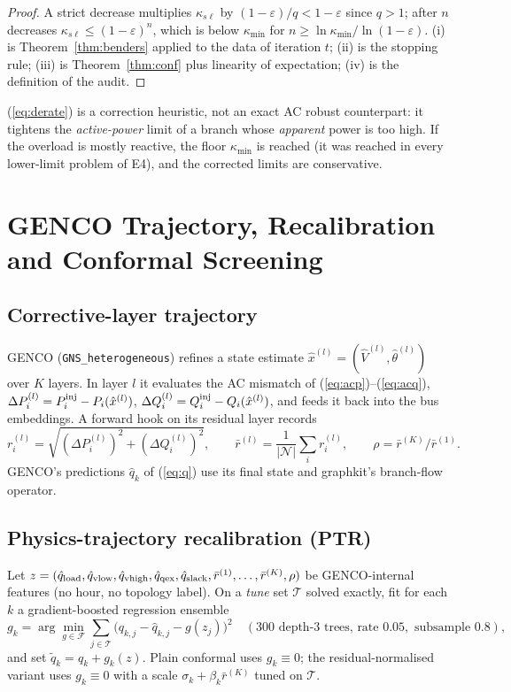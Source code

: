 \begin{proof}
A strict decrease multiplies $\kappa_{s\ell}$ by $(1-\varepsilon)/q<1-\varepsilon$ since $q>1$; after
$n$ decreases $\kappa_{s\ell}\le(1-\varepsilon)^n$, which is below $\kappa_{\min}$ for
$n\ge\ln\kappa_{\min}/\ln(1-\varepsilon)$. (i) is Theorem~\ref{thm:benders} applied to the data
of iteration $t$; (ii) is the stopping rule; (iii) is Theorem~\ref{thm:conf} plus linearity
of expectation; (iv) is the definition of the audit.
\end{proof}
\begin{remark}
(\ref{eq:derate}) is a correction heuristic, not an exact AC robust counterpart: it
tightens the \emph{active-power} limit of a branch whose \emph{apparent} power is too high.
If the overload is mostly reactive, the floor $\kappa_{\min}$ is reached (it was reached in
every lower-limit problem of E4), and the corrected limits are conservative.
\end{remark}

\section{GENCO Trajectory, Recalibration and Conformal Screening}
\label{app:conf}

\subsection{Corrective-layer trajectory}
GENCO (\texttt{GNS\_heterogeneous}) refines a state estimate $\hat x^{(l)}=(\hat V^{(l)},\hat\theta^{(l)})$ over
$K$ layers. In layer $l$ it evaluates the AC mismatch of (\ref{eq:acp})--(\ref{eq:acq}),
$\Delta P^{(l)}_i=P^{\rm inj}_i-P_i(\hat x^{(l)})$, $\Delta Q^{(l)}_i=Q^{\rm inj}_i-Q_i(\hat x^{(l)})$, and feeds it back
into the bus embeddings. A forward hook on its residual layer records
\begin{equation}
r^{(l)}_i=\sqrt{(\Delta P^{(l)}_i)^2+(\Delta Q^{(l)}_i)^2},\qquad
\bar r^{(l)}=\frac1{|\mathcal N|}\sum_i r^{(l)}_i,\qquad \rho=\bar r^{(K)}/\bar r^{(1)}.
\label{eq:traj}
\end{equation}
GENCO's predictions $\hat q_k$ of (\ref{eq:q}) use its final state and graphkit's branch-flow
operator.

\subsection{Physics-trajectory recalibration (PTR)}
Let $z=(\hat q_{\rm load},\hat q_{\rm vlow},\hat q_{\rm vhigh},\hat q_{\rm qex},\hat q_{\rm slack},\bar r^{(1)},\dots,\bar r^{(K)},\rho)$
be GENCO-internal features (no hour, no topology label). On a \emph{tune} set
$\mathcal T$ solved exactly, fit for each $k$ a gradient-boosted regression ensemble
\begin{equation}
g_k=\arg\min_{g\in\mathcal F}\sum_{j\in\mathcal T}\big(q_{k,j}-\hat q_{k,j}-g(z_j)\big)^2
\quad(300\text{ depth-3 trees, rate }0.05,\text{ subsample }0.8),
\label{eq:ptr}
\end{equation}
and set $\tilde q_k=\hat q_k+g_k(z)$. Plain conformal uses $g_k\equiv0$; the residual-normalised
variant uses $g_k\equiv0$ with a scale $\sigma_k+\beta_k\bar r^{(K)}$ tuned on $\mathcal T$.

